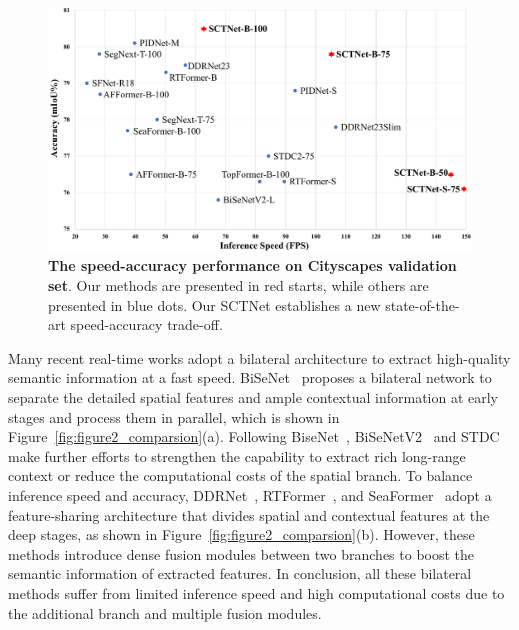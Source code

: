 \documentclass[letterpaper]{article} %
\begin{document}
\begin{figure}[tb]
  \begin{center}
     \includegraphics[width=\linewidth]{./image/figure1_trade-off_small3.pdf}
  \end{center}
  \vspace{-10pt}
     \caption{\textbf{The speed-accuracy performance on Cityscapes validation set}. Our methods are presented in red starts, while others are presented in blue dots. Our SCTNet establishes a new state-of-the-art speed-accuracy trade-off.}
  \label{fig:figure1_trade-off}
  \vspace{-10pt}
  \end{figure}

Many recent real-time works adopt a bilateral architecture to extract high-quality semantic information at a fast speed. BiSeNet~\cite{yu2018bisenet} proposes a bilateral network to separate the detailed spatial features and ample contextual information at early stages and process them in parallel, which is shown in Figure~\ref{fig:figure2_comparsion}(a). Following BiseNet~\cite{yu2018bisenet}, BiSeNetV2~\cite{yu2021bisenet} and STDC~\cite{fan2021rethinking} make further efforts to strengthen the capability to extract rich long-range context or reduce the computational costs of the spatial branch. To balance inference speed and accuracy, DDRNet~\cite{pan2022deep}, RTFormer~\cite{wang2022rtformer}, and SeaFormer~\cite{wan2023seaformer} adopt a feature-sharing architecture that divides spatial and contextual features at the deep stages, as shown in Figure~\ref{fig:figure2_comparsion}(b). However, these methods introduce dense fusion modules between two branches to boost the semantic information of extracted features. In conclusion, all these bilateral methods suffer from limited inference speed and high computational costs due to the additional branch and multiple fusion modules.
\end{document}
